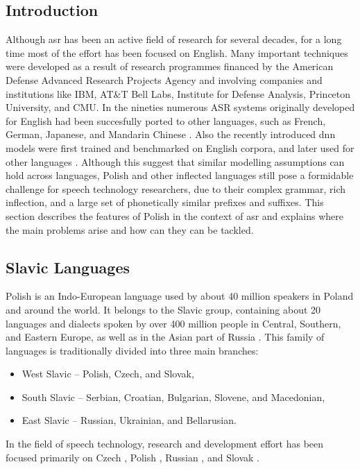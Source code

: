 \subsection{Introduction}
Although \gls{asr} has been an active field of research for several decades, for a long time most of the effort has been focused on English.  Many important techniques were developed as a result of research programmes financed by the American Defense Advanced Research Projects Agency and involving companies and institutions like IBM, AT\&T Bell Labs, Institute for Defense Analysis, Princeton University, and CMU. In the nineties numerous ASR systems originally developed for English had been succesfully ported to other languages, such as French, German, Japanese, and Mandarin Chinese \cite{besacier2014automatic}. Also the recently introduced \gls{dnn} models were first trained and benchmarked on English corpora, and later used for other languages \cite{hinton2012deep}. Although this suggest that similar modelling assumptions can hold across languages, Polish and other inflected languages still pose a formidable challenge for speech technology researchers, due to their complex grammar, rich inflection, and a large set of phonetically similar prefixes and suffixes. This section describes the features of Polish in the context of \gls{asr} and explains where the main problems arise and how can they can be tackled.
\subsection{Slavic Languages}
Polish is an Indo-European language used by about 40 million speakers in Poland and around the world. It belongs to the Slavic group, containing about 20 languages and dialects spoken by over 400 million people in Central, Southern, and Eastern Europe, as well as in the Asian part of Russia \cite{karpov2012speech}. This family of languages is traditionally divided into three main branches:
\begin{itemize}
\item West Slavic -- Polish, Czech, and Slovak,
\item South Slavic -- Serbian, Croatian, Bulgarian, Slovene, and Macedonian,
\item East Slavic -- Russian, Ukrainian, and Bellarusian.
\end{itemize}
In the field of speech technology, research and development effort has been focused primarily on Czech \cite{nouza2010adapting, oparin2008morphological}, Polish \cite{zelasko2015linguistically, ziolko2011automatic}, Russian {\cite{karpov2012speech}}, and Slovak \cite{lojka2009finite}.
